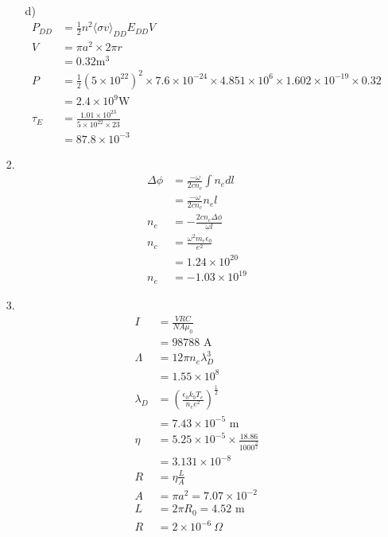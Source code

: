 \documentclass{article}
\begin{document}
\begin{itemize}
\begin{itemize}
        \item [d)]
        \begin{align*}
            P_{DD}&=\frac{1}{2}n^2\langle\sigma v \rangle_{DD}E_{DD} V\\
            V&=\pi a^2\times 2\pi r\\
            &=0.32 \text{m}^3\\
            P&=\frac{1}{2}(5\times 10^{22})^2\times 7.6\times 10^{-24}\times 4.851\times 10^6 \times 1.602\times 10^{-19}\times 0.32\\
            &=2.4\times 10^{9} \text{W}\\
            \tau_E&=\frac{1.01\times 10^{23}}{5\times 10^{22}\times 23}\\
            &=87.8\times 10^{-3}
        \end{align*}
    \end{itemize}
    \item [2.]
    \begin{align*}
        \Delta\phi &=\frac{-\omega}{2cn_c}\int n_edl\\
        &=\frac{-\omega}{2cn_c}n_el\\
        n_e&=-\frac{2cn_c\Delta \phi}{\omega l}\\
        n_c&=\frac{\omega^2m_e\epsilon_0}{e^2}\\
        &=1.24\times 10^{20}\\
        n_e&=-1.03\times 10^{19}
    \end{align*}
    \item [3.]
    \begin{align*}
        I&=\frac{VRC}{NA\mu_0}\\
        &=98788 \text{ A}\\
        \Lambda &= 12\pi n_e\lambda^3_D\\
        &=1.55\times 10^8\\
        \lambda_D&=\left(\frac{\epsilon_0k_bT_e}{n_ee^2}\right)^{\frac{1}{2}}\\
        &=7.43\times 10^{-5} \text{ m}\\
        \eta&=5.25\times 10^{-5}\times \frac{18.86}{1000^{\frac{3}{2}}}\\
        &=3.131\times 10^{-8}\\
        R&=\eta\frac{L}{A}\\
        A&=\pi a^2 = 7.07\times 10^{-2}\\
        L&=2\pi R_0=4.52 \text{ m}\\
        R&=2\times 10^{-6} \ \Omega\\

\end{align*}
\end{itemize}
\end{document}
